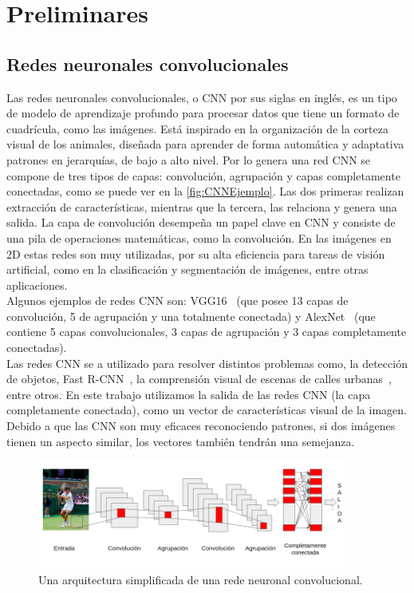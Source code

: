 \chapter{Preliminares}\label{cap:preliminares}


\section{Redes neuronales convolucionales} \label{sec:redesneuronalesconvolucionales}
Las redes neuronales convolucionales, o CNN por sus siglas en inglés, es un tipo de modelo de aprendizaje profundo para procesar datos que tiene un formato de cuadrícula, como las imágenes. Está inspirado en la organización de la corteza visual de los animales, diseñada para aprender de forma automática y adaptativa patrones en jerarquías, de bajo a alto nivel. Por lo genera una red CNN se compone de tres tipos de capas: convolución, agrupación y capas completamente conectadas, como se puede ver en la \autoref{fig:CNNEjemplo}. Las dos primeras realizan extracción de características, mientras que la tercera, las relaciona  y genera una salida. La capa de convolución desempeña un papel clave en CNN y consiste de una pila de operaciones matemáticas, como la convolución. En las imágenes en 2D estas redes son muy utilizadas, por su alta eficiencia para tareas de visión artificial, como en la clasificación y segmentación de imágenes, entre otras aplicaciones.\\

Algunos ejemplos de redes CNN son: VGG16~\cite{simonyan2014very} (que posee 13 capas de convolución, 5 de agrupación y una totalmente conectada) y AlexNet~\cite{krizhevsky2012imagenet} (que contiene 5 capas convolucionales, 3 capas de agrupación y 3 capas completamente conectadas).\\

Las redes CNN se a utilizado para resolver distintos problemas como, la detección de objetos, Fast R-CNN~\cite{girshick2015fast}, la comprensión visual de escenas de calles urbanas~\cite{cordts2016cityscapes}, entre otros. En este trabajo utilizamos la salida de las redes CNN (la capa completamente conectada), como un vector de características visual de la imagen. Debido a que las CNN son muy eficaces reconociendo patrones, si dos imágenes tienen un aspecto similar, los vectores también tendrán una semejanza.

\begin{figure}
	\centering
	\includegraphics[width=0.9\textwidth]{img/red_cnn.png}
	\caption{Una arquitectura simplificada de una rede neuronal convolucional.}
	\label{fig:CNNEjemplo}
\end{figure}

